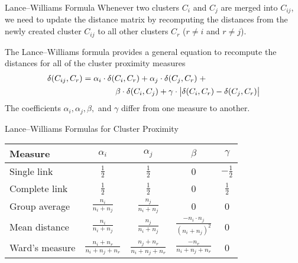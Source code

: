 \begin{frame}{Lance--Williams Formula}
Whenever two clusters $C_i$ and $C_{j}$ are merged into $C_{ij}$,
we need to update the distance matrix by recomputing the
distances from the newly created cluster $C_{ij}$ to all other
clusters $C_r$ ($r \ne i$ and $r \ne j$).

\medskip
The Lance--Williams formula provides a general equation to
recompute the distances for all of the cluster
proximity measures
\begin{align*}
    \delta(C_{ij},C_r) & =
        \alpha_i \cdot \delta(C_i,C_r) +
        \alpha_{j} \cdot \delta(C_{j},C_r)\; +\nonumber\\
        & \qquad \qquad \beta \cdot \delta(C_i,C_{j}) +
        \gamma \cdot \bigl|\delta(C_i,C_r)-\delta(C_{j},C_r)\bigr|
\end{align*}
The coeff\/{i}cients $\alpha_i, \alpha_{j}, \beta,$ {and} $\gamma$ differ from
one measure to another.
\end{frame}


\begin{frame}{Lance--Williams Formulas for Cluster Proximity}
\renewcommand{\arraystretch}{1.3}
\begin{center}
\begin{tabular}{|l|c|c|c|c|}
\hline
Measure & $\alpha_i$ & $\alpha_{j}$ & $\beta$ & $\gamma$ \\ \hline \hline
Single link   &  $\frac{1}{2}$ & $\frac{1}{2}$ & 0 & $-\frac{1}{2}$
\\ \hline
Complete link &  $\frac{1}{2}$ & $\frac{1}{2}$ & 0 & $\frac{1}{2}$
\\ \hline
Group average &  $\frac{n_i}{n_i+n_{j}}$ & $\frac{n_{j}}{n_i+n_{j}}$ &0&0
\\ \hline
Mean distance & $\frac{n_i}{n_i+n_{j}}$ &
$\frac{n_{j}}{n_i+n_{j}}$ &  $\frac{-n_i \cdot n_{j}}{(n_i+n_{j})^2}$ & 0
\\
\hline
Ward's measure        & $\frac{n_i+n_r}{n_i+n_{j}+n_r}$ &
$\frac{n_{j}+n_r}{n_i+n_{j}+n_r}$ &  $\frac{-n_r}{n_i+n_{j}+n_r}$ & 0 \\[2ex]
\hline
\end{tabular}
\end{center}
\end{frame}

